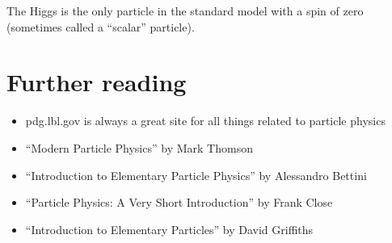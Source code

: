 The Higgs is the only particle in the standard model with a spin of zero (sometimes called a ``scalar'' particle).

\section{Further reading}
\begin{itemize}
\item pdg.lbl.gov is always a great site for all things related to particle physics
\item ``Modern Particle Physics” by Mark Thomson
\item ``Introduction to Elementary Particle Physics” by Alessandro Bettini
\item ``Particle Physics: A Very Short Introduction'' by Frank Close
\item ``Introduction to Elementary Particles'' by David Griffiths
\end{itemize}


